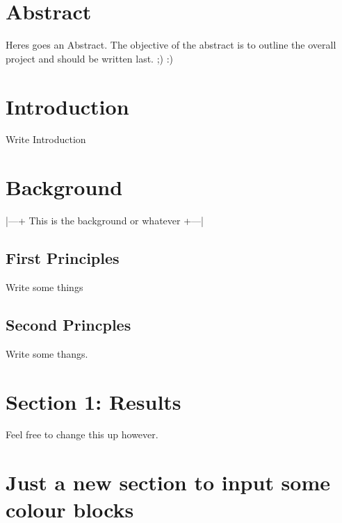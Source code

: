 




\section*{Abstract}
Heres goes an Abstract. The objective of the abstract is to outline the overall project and should be written last. ;) :)

\tableofcontents
\clearpage
{}
\section{Introduction}
Write Introduction


\section{Background}
|---+ This is the background or whatever +---|

\subsection{First Principles}
Write some things

\subsection{Second Princples}
Write some thangs.

\section{Section 1: Results}
Feel free to change this up however.
\citep{harris2004}

\section{Just a new section to input some colour blocks}

\clearpage

